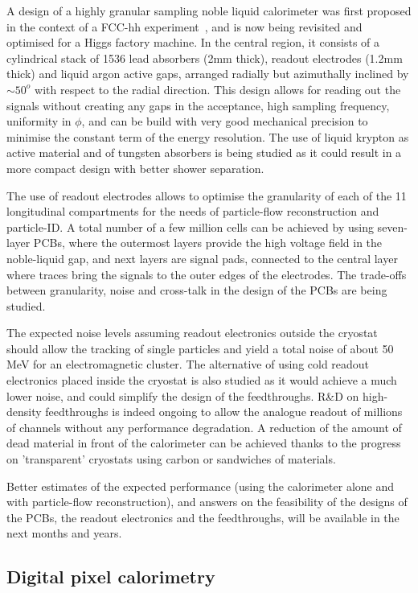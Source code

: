 A design of a highly granular sampling noble liquid calorimeter was first proposed in the context of a FCC-hh experiment~\cite{Aleksa:2019pvl}, and is now being revisited and optimised for a Higgs factory machine. In the central region, it consists of a cylindrical stack of 1536 lead absorbers (2mm thick), readout electrodes (1.2mm thick) and liquid argon active gaps, arranged radially but azimuthally inclined by $\sim 50^o$ with respect to the radial direction. This design allows for reading out the signals without creating any gaps in the acceptance, high sampling frequency, uniformity in $\phi$, and can be build with very good mechanical precision to minimise the constant term of the energy resolution. The use of liquid krypton as active material and of tungsten absorbers is being studied as it could result in a more compact design with better shower separation.

The use of readout electrodes allows to optimise the granularity of each of the 11 longitudinal compartments for the needs of particle-flow reconstruction and particle-ID. A total number of a few million cells can be achieved by using seven-layer PCBs, where the outermost layers provide the high voltage field in the noble-liquid gap, and next layers are signal pads, connected to the central layer where traces bring the signals to the outer edges of the electrodes. The trade-offs between granularity, noise and cross-talk in the design of the PCBs are being studied.

The expected noise levels assuming readout electronics outside the cryostat should allow
the tracking of single particles and yield a total noise of about 50\,MeV for an
electromagnetic cluster. The alternative of using cold readout electronics placed inside
the cryostat is also studied as it would achieve a much lower noise, and could simplify
the design of the feedthroughs. R\&D on high-density feedthroughs is indeed ongoing to
allow the analogue readout of millions of channels without any performance degradation.
A reduction of the amount of dead material in front of the calorimeter can be achieved
thanks to the progress on 'transparent' cryostats using carbon or sandwiches of
materials.

Better estimates of the expected performance (using the calorimeter alone and with particle-flow reconstruction), and answers on the feasibility of the designs of the PCBs, the readout electronics and the feedthroughs, will be available in the next months and years.

\subsection{Digital pixel calorimetry}


